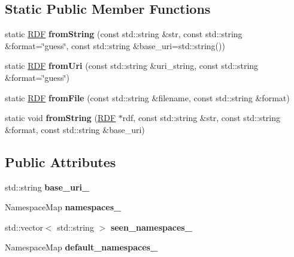 \subsection*{Static Public Member Functions}
\begin{DoxyCompactItemize}
\item 
\mbox{\label{classsemsim_1_1RDF_a77782a3756ed6243ee9b842c6b0f06b8}} 
static \hyperlink{classsemsim_1_1RDF}{R\+DF} {\bfseries from\+String} (const std\+::string \&str, const std\+::string \&format=\char`\"{}guess\char`\"{}, const std\+::string \&base\+\_\+uri=std\+::string())
\item 
\mbox{\label{classsemsim_1_1RDF_a3d14028f5953a4e007cfe8f9a34b3e0d}} 
static \hyperlink{classsemsim_1_1RDF}{R\+DF} {\bfseries from\+Uri} (const std\+::string \&uri\+\_\+string, const std\+::string \&format=\char`\"{}guess\char`\"{})
\item 
\mbox{\label{classsemsim_1_1RDF_ab5f969412a37a4ecad5f8485177ae561}} 
static \hyperlink{classsemsim_1_1RDF}{R\+DF} {\bfseries from\+File} (const std\+::string \&filename, const std\+::string \&format)
\item 
\mbox{\label{classsemsim_1_1RDF_ab1c83f13027f0946d08dd21368706f3b}} 
static void {\bfseries from\+String} (\hyperlink{classsemsim_1_1RDF}{R\+DF} $\ast$rdf, const std\+::string \&str, const std\+::string \&format, const std\+::string \&base\+\_\+uri)
\end{DoxyCompactItemize}
\subsection*{Public Attributes}
\begin{DoxyCompactItemize}
\item 
\mbox{\label{classsemsim_1_1RDF_a03a6df29bae51bba853a11d5eb433835}} 
std\+::string {\bfseries base\+\_\+uri\+\_\+}
\item 
\mbox{\label{classsemsim_1_1RDF_a106ee70106beb1c1304c8968470f3033}} 
Namespace\+Map {\bfseries namespaces\+\_\+}
\item 
\mbox{\label{classsemsim_1_1RDF_af3bbb4dc4ce350bf60fc6a94bffd41b2}} 
std\+::vector$<$ std\+::string $>$ {\bfseries seen\+\_\+namespaces\+\_\+}
\item 
Namespace\+Map {\bfseries default\+\_\+namespaces\+\_\+}
\end{DoxyCompactItemize}


